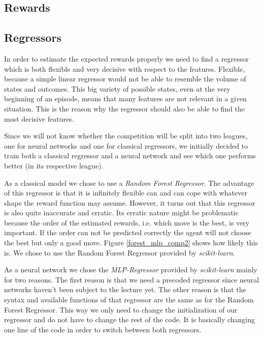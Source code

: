 	\subsection{Rewards}
	
	
	\subsection{Regressors}
	In order to estimate the expected rewards properly we need to find a regressor which is both flexible and very decisive with respect to the features. Flexible, because a simple linear regressor would not be able to resemble the volume of states and outcomes. This big variety of possible states, even at the very beginning of an episode, means that many features are not relevant in a given situation. This is the reason why the regressor should also be able to find the most decisive features.\par
	
	Since we will not know whether the competition will be split into two leagues, one for neural networks and one for classical regressors, we initially decided to train both a classical regressor and a neural network and see which one performs better (in its respective league).\par
	
	As a classical model we chose to use a \textit{Random Forest Regressor}. The advantage of this regressor is that it is infinitely flexible can and can cope with whatever shape the reward function may assume. However, it turns out that this regressor is also quite inaccurate and erratic. Its erratic nature might be problematic because the order of the estimated rewards, i.e. which move is the best, is very important. If the order can not be predicted correctly the agent will not choose the best but only a good move. Figure \ref{forest_mlp_comp2} shows how likely this is. We chose to use the Random Forest Regressor provided by \textit{scikit-learn}.\par
	
	As a neural network we chose the \textit{MLP-Regressor} provided by \textit{scikit-learn} mainly for two reasons. The first reason is that we need a precoded regressor since neural networks haven't been subject to the lecture yet. The other reason is that the syntax and available functions of that regressor are the same as for the Random Forest Regressor. This way we only need to change the initialization of our regressor and do not have to change the rest of the code. It is basically changing one line of the code in order to switch between both regressors.\par
	

